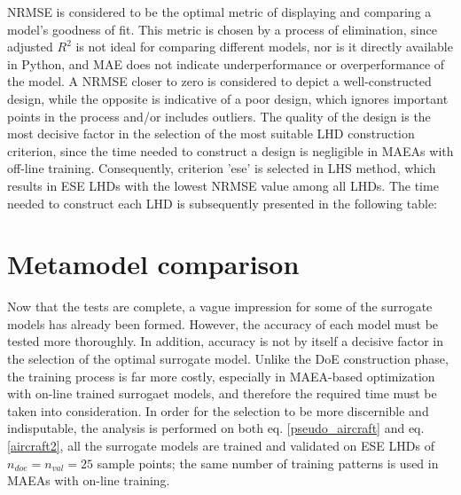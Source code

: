 NRMSE is considered to be the optimal metric of 
displaying and comparing a model's goodness of fit. This metric is 
chosen by a process of elimination, since adjusted $R^2$ is not 
ideal for comparing different models, nor is it directly 
available in Python, and MAE does not indicate underperformance or 
overperformance of the model. A NRMSE closer to zero is considered 
to depict a well-constructed design, while the opposite is 
indicative of a poor design, which ignores important points in 
the process and/or includes outliers. The quality of the design
is the most decisive factor in the selection of the most suitable 
LHD construction criterion, since the time needed to construct a
design is negligible in MAEAs with off-line training. Consequently, 
criterion 'ese' is selected in LHS method, which results in ESE 
LHDs with the lowest NRMSE value among all LHDs. The time needed to 
construct each LHD is subsequently presented in the following 
table:

\begin{table}[h!]
\centering
\caption{Average LHD construction time, the process is repeated 
$n_{test} = 50$ times
evaluations}
\label{table:construction_criterion_sampling_time}
\end{table}

\newpage


\section{Metamodel comparison}
Now that the tests are complete, a vague impression for 
some of the surrogate models has already been formed. 
However, the accuracy of each model must be tested more thoroughly. 
In addition, accuracy is not by itself a decisive factor in the 
selection of the optimal surrogate model. Unlike the DoE 
construction phase, the training process is far more costly, 
especially in MAEA-based optimization with on-line trained 
surrogaet models, and therefore the required time must be taken 
into consideration. In order for the selection to be more 
discernible and indisputable, the analysis is performed on both eq. 
\ref{pseudo_aircraft} and eq. \ref{aircraft2}, all the surrogate 
models are trained and validated on ESE LHDs of $n_{doe} \! = \! 
n_{val} = 25$ sample points; the same number of training patterns  
is used in MAEAs with on-line training. 


